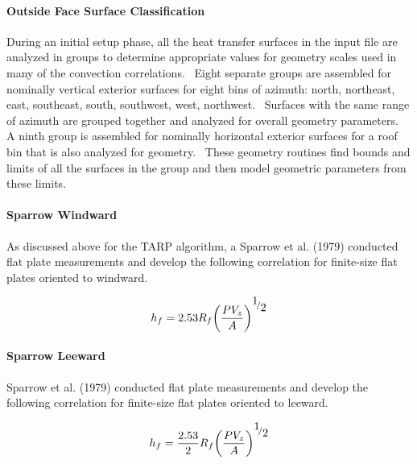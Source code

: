 \paragraph{Outside Face Surface Classification}\label{outside-face-surface-classification}

During an initial setup phase, all the heat transfer surfaces in the input file are analyzed in groups to determine appropriate values for geometry scales used in many of the convection correlations.~ Eight separate groups are assembled for nominally vertical exterior surfaces for eight bins of azimuth: north, northeast, east, southeast, south, southwest, west, northwest.~ Surfaces with the same range of azimuth are grouped together and analyzed for overall geometry parameters.~ A ninth group is assembled for nominally horizontal exterior surfaces for a roof bin that is also analyzed for geometry.~ These geometry routines find bounds and limits of all the surfaces in the group and then model geometric parameters from these limits.

\paragraph{Sparrow Windward}\label{sparrow-windward}

As discussed above for the TARP algorithm, a Sparrow et al. (1979) conducted flat plate measurements and develop the following correlation for finite-size flat plates oriented to windward.

\begin{equation}
{h_f} = 2.53{R_f}{\left( {\frac{{P{V_z}}}{A}} \right)^{{\raise0.7ex\hbox{1} \!\mathord{\left/ {\vphantom {1 2}}\right.}\!\lower0.7ex\hbox{2}}}}
\end{equation}

\paragraph{Sparrow Leeward}\label{sparrow-leeward}

Sparrow et al. (1979) conducted flat plate measurements and develop the following correlation for finite-size flat plates oriented to leeward.

\begin{equation}
{h_f} = \frac{{2.53}}{2}{R_f}{\left( {\frac{{P{V_z}}}{A}} \right)^{{\raise0.7ex\hbox{1} \!\mathord{\left/ {\vphantom {1 2}}\right.}\!\lower0.7ex\hbox{2}}}}
\end{equation}

